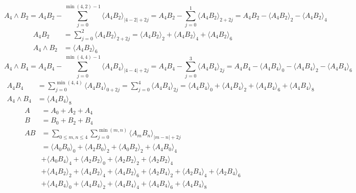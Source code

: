 \documentclass[aps, preprint]{revtex4}
\begin{document}
\begin{equation}A_{4} \wedge B_{2} =A_{4} B_{2} -\sum _{j =0}^{\min \left (4 ,2\right ) -1} \langle A_{4} B_{2} \rangle _{\left \vert 4 -2\right \vert  +2 j} =A_{4} B_{2} -\sum _{j =0}^{1} \langle A_{4} B_{2} \rangle _{2 +2 j} =A_{4} B_{2} - \langle A_{4} B_{2} \rangle _{2} - \langle A_{4} B_{2} \rangle _{4}
\end{equation}
\begin{align}A_{4} B_{2} &  =\sum _{j =0}^{2} \langle A_{4} B_{2} \rangle _{2 +2 j} = \langle A_{4} B_{2} \rangle _{2} + \langle A_{4} B_{2} \rangle _{4} + \langle A_{4} B_{2} \rangle _{6} \\
A_{4} \wedge B_{2} &  = \langle A_{4} B_{2} \rangle _{6}\end{align}
\begin{equation}A_{4} \wedge B_{4} =A_{4} B_{4} -\sum _{j =0}^{\min \left (4 ,4\right ) -1} \langle A_{4} B_{4} \rangle _{\left \vert 4 -4\right \vert  +2 j} =A_{4} B_{4} -\sum _{j =0}^{3} \langle A_{4} B_{4} \rangle _{2 j} =A_{4} B_{4} - \langle A_{4} B_{4} \rangle _{0} - \langle A_{4} B_{4} \rangle _{2} - \langle A_{4} B_{4} \rangle _{6}
\end{equation}
\begin{align}A_{4} B_{4} &  =\sum _{j =0}^{\min \left (4 ,4\right )} \langle A_{4} B_{4} \rangle _{0 +2 j} =\sum _{j =0}^{4} \langle A_{4} B_{4} \rangle _{2 j} = \langle A_{4} B_{4} \rangle _{0} + \langle A_{4} B_{4} \rangle _{2} + \langle A_{4} B_{4} \rangle _{6} + \langle A_{4} B_{4} \rangle _{8} \\
A_{4} \wedge B_{4} &  = \langle A_{4} B_{4} \rangle _{8}\end{align}
\begin{align}A &  =A_{0} +A_{2} +A_{4} \\
B &  =B_{0} +B_{2} +B_{4} \\
A B &  =\sum _{0 \leq m ,n \leq 4}\sum _{j =0}^{\min \left (m ,n\right )} \langle A_{m} B_{n} \rangle _{\left \vert m -n\right \vert  +2 j} \\
 &  = \langle A_{0} B_{0} \rangle _{0} + \langle A_{2} B_{0} \rangle _{2} + \langle A_{0} B_{2} \rangle _{2} + \langle A_{4} B_{0} \rangle _{4} \\
 &  + \langle A_{0} B_{4} \rangle _{4} + \langle A_{2} B_{2} \rangle _{0} + \langle A_{2} B_{2} \rangle _{2} + \langle A_{2} B_{2} \rangle _{4} \\
 &  + \langle A_{4} B_{2} \rangle _{2} + \langle A_{4} B_{2} \rangle _{4} + \langle A_{4} B_{2} \rangle _{6} + \langle A_{2} B_{4} \rangle _{2} + \langle A_{2} B_{4} \rangle _{4} + \langle A_{2} B_{4} \rangle _{6} \\
 &  + \langle A_{4} B_{4} \rangle _{0} + \langle A_{4} B_{4} \rangle _{2} + \langle A_{4} B_{4} \rangle _{4} + \langle A_{4} B_{4} \rangle _{6} + \langle A_{4} B_{4} \rangle _{8}\end{align}
\end{document}
